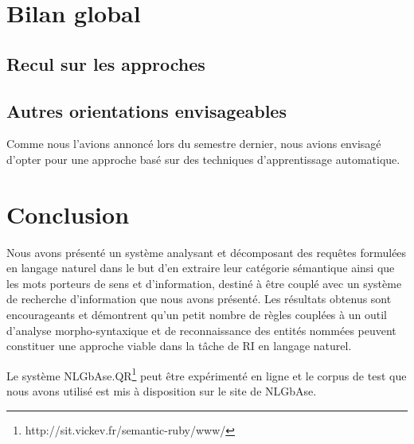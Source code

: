 \documentclass[10pt,a4paper]{article}
\begin{document}
\section{Bilan global}
\subsection{Recul sur les approches}
\subsection{Autres orientations envisageables}
Comme nous l'avions annoncé lors du semestre dernier, nous avions envisagé d'opter pour une approche basé sur des techniques d'apprentissage automatique.

\section{Conclusion}
\par Nous avons présenté un système analysant et décomposant des requêtes formulées en langage naturel dans le but d'en extraire leur catégorie sémantique ainsi que les mots porteurs de sens et d'information, destiné à être couplé avec un système de recherche d'information que nous avons présenté. Les résultats obtenus sont encourageants et démontrent qu'un petit nombre de règles couplées à un outil d'analyse morpho-syntaxique et de reconnaissance des entités nommées peuvent constituer une approche viable dans la tâche de RI en langage naturel.%
\par Le système NLGbAse.QR\footnote{http://sit.vickev.fr/semantic-ruby/www/} peut être expérimenté en ligne et le corpus de test que nous avons utilisé est mis à disposition sur le site de NLGbAse.




\end{document}
